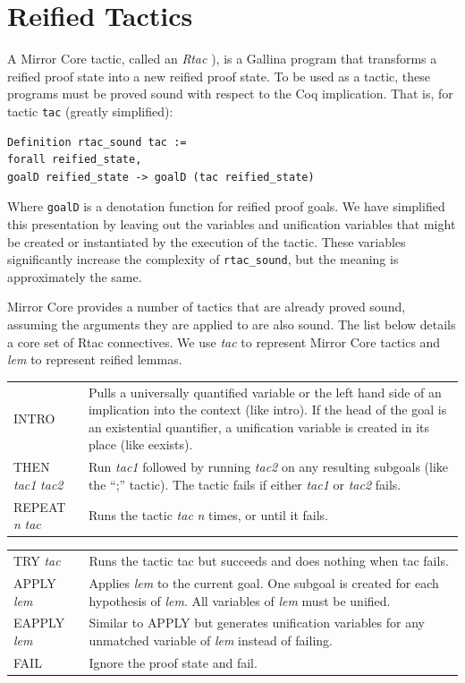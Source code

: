 \documentclass{puthesis}
\begin{document}
\section{Reified Tactics}

A Mirror Core tactic, called an \emph{Rtac} \cite[chapter
  6]{malecha:thesis}), is a Gallina program that transforms a reified
proof state into a new reified proof state. To be used as a tactic,
these programs must be proved sound with respect to the Coq
implication. That is, for tactic \lstinline|tac| (greatly simplified):

\begin{lstlisting}
Definition rtac_sound tac := 
forall reified_state,
goalD reified_state -> goalD (tac reified_state)
\end{lstlisting}

Where \lstinline|goalD| is a denotation function for reified proof
goals. We have simplified this presentation by leaving out the variables
and unification variables that might be created or instantiated by the
execution of the tactic. These variables significantly increase the
complexity of \lstinline|rtac_sound|, but the meaning is approximately the same.

Mirror Core provides a number of tactics that are already proved
sound, assuming the arguments they are applied to are also sound.  The
list below details a core set of Rtac connectives. We use {\it tac} to
represent Mirror Core tactics and {\it lem} to represent reified
lemmas.

\vspace{5mm}

\noindent \begin{tabular}{l@{\quad\quad}p{90mm}}
{\sf INTRO} & Pulls a universally quantified variable or the left hand
side of an
implication into the context (like {\sf intro}). If the head of the goal is an existential
quantifier, a unification variable is created in its place (like {\sf
  eexists}). \\
{\sf THEN} {\it tac1} {\it tac2} & Run {\it tac1} followed by running {\it
  tac2} on any resulting subgoals (like the ``{\sf ;}'' tactic). The tactic fails if either 
  {\it tac1} or {\it tac2} fails.\\
{\sf REPEAT} {\it n} {\it tac} & Runs the tactic {\it tac} {\it n}
times, or until it fails. \\
\end{tabular}

\noindent \begin{tabular}{l@{\quad\quad}p{90mm}}
{\sf TRY} {\it tac} & Runs the tactic {\sf tac} but succeeds and does
nothing when {\sf tac} fails.\\
{\sf APPLY} {\it lem} & Applies {\it lem} to the current goal. One
subgoal is created for each hypothesis of {\it lem}. All variables of
{\it lem} must be unified.\\
{\sf EAPPLY} {\it lem} & Similar to {\sf APPLY} but generates
unification variables for any unmatched variable of {\it lem} instead
of failing. \\
{\sf FAIL} & Ignore the proof state and fail. \\ 
\end{tabular}
\end{document}
